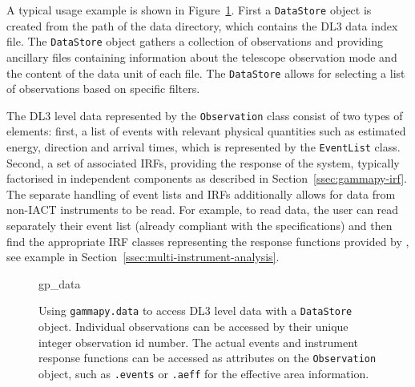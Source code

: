 \documentclass[traditabstract, longauth]{aa}
\newcommand{\code}[1]{\texttt{#1}}
\begin{document}
A typical usage example is shown in Figure~\ref{fig*:minted:gp_data}.
First a \code{DataStore} object is created from the path of the data
directory, which contains the DL3 data index file. The \code{DataStore}
object gathers a collection of observations and providing ancillary
files containing information about the telescope observation mode and the
content of the data unit of each file. The \code{DataStore} allows for
selecting a list of observations based on specific filters.

The DL3 level data represented by the \code{Observation} class consist
of two types of elements: first, a list of \gammaray events with relevant physical
quantities such as estimated energy, direction and arrival
times, which is represented by the \code{EventList} class. Second, a set of
associated IRFs, providing the response of the system, typically
factorised in independent components as described in
Section~\ref{ssec:gammapy-irf}. The separate handling of event lists and IRFs
additionally allows for data from non-IACT \gammaray instruments to be read. For
example, to read \fermi data, the user can read separately their event list
(already compliant with the \gadf specifications) and then find the appropriate
IRF classes representing the response functions provided by \fermi, see
example in Section~\ref{ssec:multi-instrument-analysis}.
%
\begin{figure}
	\small
	{gp_data}
	\caption{
        Using \code{gammapy.data} to access DL3 level data with a \code{DataStore} object.
        Individual observations can be accessed by their unique integer observation id number.
        The actual events and instrument response functions can be accessed
        as attributes on the \code{Observation} object, such as \code{.events}
        or \code{.aeff} for the effective area information.
    }
	\label{fig*:minted:gp_data}
\end{figure}
%
\end{document}
